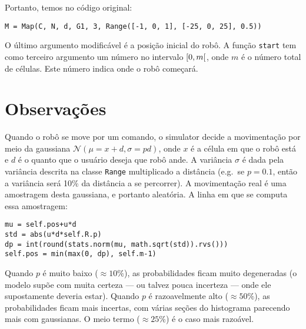 \documentclass[12pt]{article}
\theoremstyle{plain}
\numberwithin{equation}{section}
\newcommand{\code}[1]{\lstinline[mathescape=true]{#1}}
\begin{document}
Portanto, temos no código original:\\

\begin{lstlisting}
M = Map(C, N, d, G1, 3, Range([-1, 0, 1], [-25, 0, 25], 0.5))
\end{lstlisting}

O último argumento modificável é a posição inicial do robô. A função \code{start} tem como terceiro
argumento um número no intervalo $\interval[open right]{0}{m}$, onde $m$ é o número total de
células. Este número indica onde o robô começará.

\section{Observações}

Quando o robô se move por um comando, o simulator decide a movimentação por meio da gaussiana
$\mathcal{N}(\mu=x+d,\sigma=pd)$, onde $x$ é a célula em que o robô está e $d$ é o quanto que o
usuário deseja que robô ande. A variância $\sigma$ é dada pela variância descrita na classe
\code{Range} multiplicado a distância (e.g.\ se $p=0.1$, então a variância será 10\% da distância a
se percorrer). A movimentação real é uma amostragem desta gaussiana, e portanto aleatória. A
linha em que se computa essa amostragem:\\

\begin{lstlisting}
mu = self.pos+u*d
std = abs(u*d*self.R.p)
dp = int(round(stats.norm(mu, math.sqrt(std)).rvs()))
self.pos = min(max(0, dp), self.m-1) 
\end{lstlisting}

Quando $p$ é muito baixo ($\approx 10\%$), as probabilidades ficam muito degeneradas (o modelo
supõe com muita certeza --- ou talvez pouca incerteza --- onde ele supostamente deveria estar).
Quando $p$ é razoavelmente alto ($\approx 50\%$), as probabilidades ficam mais incertas, com várias
seções do histograma parecendo mais com gaussianas. O meio termo ($\approx 25\%$) é o caso mais
razoável.
\end{document}
